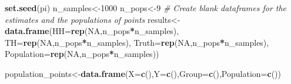 \documentclass[
]{article}
\newenvironment{Shaded}{\begin{snugshade}}{\end{snugshade}}
\newcommand{\AttributeTok}[1]{\textcolor[rgb]{0.13,0.29,0.53}{#1}}
\newcommand{\CommentTok}[1]{\textcolor[rgb]{0.56,0.35,0.01}{\textit{#1}}}
\newcommand{\ConstantTok}[1]{\textcolor[rgb]{0.56,0.35,0.01}{#1}}
\newcommand{\DecValTok}[1]{\textcolor[rgb]{0.00,0.00,0.81}{#1}}
\newcommand{\FunctionTok}[1]{\textcolor[rgb]{0.13,0.29,0.53}{\textbf{#1}}}
\newcommand{\NormalTok}[1]{#1}
\newcommand{\OtherTok}[1]{\textcolor[rgb]{0.56,0.35,0.01}{#1}}
\newcommand{\SpecialCharTok}[1]{\textcolor[rgb]{0.81,0.36,0.00}{\textbf{#1}}}
\begin{document}
\begin{Shaded}
\begin{Highlighting}[]
\FunctionTok{set.seed}\NormalTok{(pi)}
\NormalTok{n\_samples}\OtherTok{\textless{}{-}}\DecValTok{1000}
\NormalTok{n\_pops}\OtherTok{\textless{}{-}}\DecValTok{9}
\CommentTok{\# Create blank dataframes for the estimates and the populations of points}
\NormalTok{results}\OtherTok{\textless{}{-}}\FunctionTok{data.frame}\NormalTok{(}\AttributeTok{HH=}\FunctionTok{rep}\NormalTok{(}\ConstantTok{NA}\NormalTok{,n\_pops}\SpecialCharTok{*}\NormalTok{n\_samples),}
                    \AttributeTok{TH=}\FunctionTok{rep}\NormalTok{(}\ConstantTok{NA}\NormalTok{,n\_pops}\SpecialCharTok{*}\NormalTok{n\_samples),}
                    \AttributeTok{Truth=}\FunctionTok{rep}\NormalTok{(}\ConstantTok{NA}\NormalTok{,n\_pops}\SpecialCharTok{*}\NormalTok{n\_samples),}
                    \AttributeTok{Population=}\FunctionTok{rep}\NormalTok{(}\ConstantTok{NA}\NormalTok{,n\_pops}\SpecialCharTok{*}\NormalTok{n\_samples))}

\NormalTok{population\_points}\OtherTok{\textless{}{-}}\FunctionTok{data.frame}\NormalTok{(}\AttributeTok{X=}\FunctionTok{c}\NormalTok{(),}\AttributeTok{Y=}\FunctionTok{c}\NormalTok{(),}\AttributeTok{Group=}\FunctionTok{c}\NormalTok{(),}\AttributeTok{Population=}\FunctionTok{c}\NormalTok{())}


\end{Highlighting}
\end{Shaded}
\end{document}
